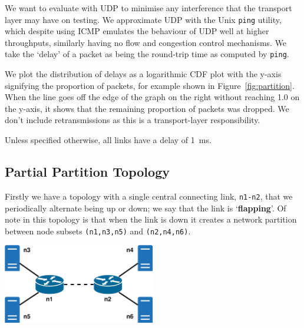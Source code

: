 \documentclass[withindex,glossary,openany]{cam-thesis}
\begin{document}
We want to evaluate with UDP to minimise any interference that the transport layer may have on testing. We approximate UDP with the Unix \texttt{ping} utility, which despite using ICMP emulates the behaviour of UDP well at higher throughputs, similarly having no flow and congestion control mechanisms. We take the `delay' of a packet as being the round-trip time as computed by \texttt{ping}.


We plot the distribution of delays as a logarithmic CDF plot with the y-axis signifying the proportion of packets, for example shown in Figure~\ref{fig:partition}. When the line goes off the edge of the graph on the right without reaching 1.0 on the y-axis, it shows that the remaining proportion of packets was dropped. We don't include retransmissions as this is a transport-layer responsibility.

Unless specified otherwise, all links have a delay of \SI{1}{\ms}.

\subsection{Partial Partition Topology}

Firstly we have a topology with a single central connecting link, \texttt{n1-n2}, that we periodically alternate being up or down; we say that the link is `\textbf{flapping}'. Of note in this topology is that when the link is down it creates a network partition between node subsets \texttt{(n1,n3,n5)} and \texttt{(n2,n4,n6)}.

\begin{minipage}{1\textwidth} \centering
	\includegraphics[width=0.5\textwidth]{delay_partition_topology}
	\label{fig:partition_topology}
\end{minipage}
\end{document}
